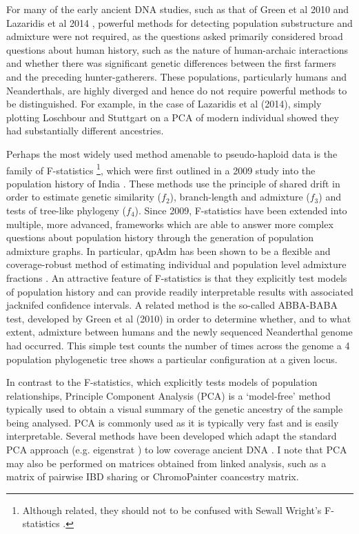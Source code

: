 For many of the early ancient DNA studies, such as that of Green et al 2010 \cite{Green2010} and Lazaridis et al 2014 \cite{Lazaridis2014}, powerful methods for detecting population substructure and admixture were not required, as the questions asked primarily considered broad questions about human history, such as the nature of human-archaic interactions and whether there was significant genetic differences between the first farmers and the preceding hunter-gatherers. These populations, particularly humans and Neanderthals, are highly diverged and hence do not require powerful methods to be distinguished. For example, in the case of Lazaridis et al (2014), simply plotting Loschbour and Stuttgart on a PCA of modern individual showed they had substantially different ancestries.

Perhaps the most widely used method amenable to pseudo-haploid data is the family of F-statistics \footnote{Although related, they should not to be confused with Sewall Wright's F-statistics \cite{wright1949genetical}.}, which were first outlined in a 2009 study into the population history of India \cite{reich2009reconstructing}. These methods use the principle of shared drift in order to estimate genetic similarity ($f_{2}$), branch-length and admixture ($f_{3}$) and tests of tree-like phylogeny ($f_{4}$). Since 2009, F-statistics have been extended into multiple, more advanced, frameworks which are able to answer more complex questions about population history through the generation of population admixture graphs. In particular, qpAdm has been shown to be a flexible and coverage-robust method of estimating individual and population level admixture fractions \cite{AssessingqpAdm}. An attractive feature of F-statistics is that they explicitly test models of population history and can provide readily interpretable results with associated jacknifed confidence intervals. A related method is the so-called ABBA-BABA test, developed by Green et al (2010) \cite{Green2010} in order to determine whether, and to what extent, admixture between humans and the newly sequenced Neanderthal genome had occurred. This simple test counts the number of times across the genome a 4 population phylogenetic tree shows a particular configuration at a given locus. 

In contrast to the F-statistics, which explicitly tests models of population relationships, Principle Component Analysis (PCA) is a `model-free' method typically used to obtain a visual summary of the genetic ancestry of the sample being analysed. PCA is commonly used as it is typically very fast and is easily interpretable. Several methods have been developed which adapt the standard PCA approach (e.g. eigenstrat \cite{price2006principal}) to low coverage ancient DNA \cite{franccois2020factor, herrando2021smartsnp, AlbrechtsenPCAmissingness}. I note that PCA may also be performed on matrices obtained from linked analysis, such as a matrix of pairwise IBD sharing or ChromoPainter coancestry matrix. 

